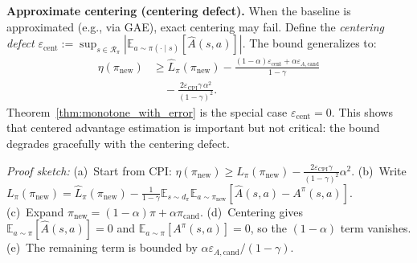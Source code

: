 \documentclass{article}
\theoremstyle{plain}
\theoremstyle{definition}
\theoremstyle{remark}
\newtheorem{remark}[theorem]{Remark}
\newcommand{\shortonly}[1]{#1}
\newcommand{\longonly}[1]{}
\newcommand{\shortonly}[1]{}
\newcommand{\longonly}[1]{#1}
\newcommand{\E}{\mathbb{E}}
\begin{document}
\shortonly{
\textbf{Approximate centering (centering defect).}
When the baseline is approximated (e.g., via GAE), exact centering may fail.
Define the \emph{centering defect} $\varepsilon_{\mathrm{cent}} := \sup_{s\in\mathcal{R}_\pi}|\E_{a\sim\pi(\cdot\mid s)}[\widehat A(s,a)]|$.
The bound generalizes to:
\[
\begin{aligned}
\eta(\pi_{\mathrm{new}})
&\ge
\widehat{L}_\pi(\pi_{\mathrm{new}})
- \frac{(1-\alpha)\varepsilon_{\mathrm{cent}}+\alpha\varepsilon_{A,\mathrm{cand}}}{1-\gamma} \\
&\quad
- \frac{2\varepsilon_{\mathrm{CPI}}\gamma\,\alpha^2}{(1-\gamma)^2}.
\end{aligned}
\]
Theorem~\ref{thm:monotone_with_error} is the special case $\varepsilon_{\mathrm{cent}}=0$.
This shows that centered advantage estimation is important but not critical: the bound degrades gracefully with the centering defect.
}%
\longonly{When centering is only approximate, the bound degrades gracefully via the centering defect $\varepsilon_{\mathrm{cent}}$ (Remark~\ref{rem:approx_centering}).}

\longonly{
\begin{remark}[Why the $\alpha$ factor can matter in practice]
For $\gamma=0.99$, the prefactor $1/(1-\gamma)$ equals $100$.
If $\alpha=0.05$, the evaluation-error penalty in~\eqref{eq:main_theorem} contributes $\alpha/(1-\gamma)=5$ times $\varepsilon_{A,\mathrm{cand}}$, i.e., a $20\times$ reduction relative to a worst-case $\varepsilon_A/(1-\gamma)$ scaling when $\varepsilon_{A,\mathrm{cand}}\approx\varepsilon_A$.
\end{remark}}

\emph{Proof sketch:}
(a)~Start from CPI: $\eta(\pi_{\mathrm{new}}) \ge L_\pi(\pi_{\mathrm{new}}) - \frac{2\varepsilon_{\mathrm{CPI}}\gamma}{(1-\gamma)^2}\alpha^2$.
(b)~Write $L_\pi(\pi_{\mathrm{new}}) = \widehat L_\pi(\pi_{\mathrm{new}}) - \frac{1}{1-\gamma}\E_{s\sim d_\pi}\E_{a\sim\pi_{\mathrm{new}}}[\widehat A(s,a) - A^\pi(s,a)]$.
(c)~Expand $\pi_{\mathrm{new}}=(1-\alpha)\pi+\alpha\pi_{\mathrm{cand}}$.
(d)~Centering gives $\E_{a\sim\pi}[\widehat A(s,a)]=0$ and $\E_{a\sim\pi}[A^\pi(s,a)]=0$, so the $(1-\alpha)$ term vanishes.
(e)~The remaining term is bounded by $\alpha\varepsilon_{A,\mathrm{cand}}/(1-\gamma)$.
\end{document}
